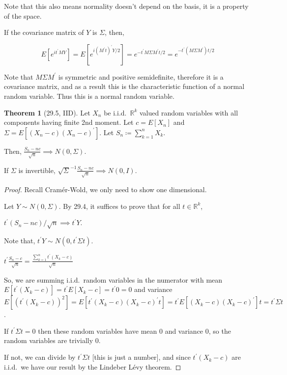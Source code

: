 \documentclass{article}
\theoremstyle{definition}
\newtheorem{theorem}{Theorem}
\begin{document}
Note that this also means normality doesn't depend on the basis, it is a property of the space.

If the covariance matrix of \(Y\) is \(\Sigma\), then,

\[
    E[e^{it^{\prime} MY}] = E[e^{i(M^{\prime} t)^{\prime} Y / 2}] = e^{- t^{\prime} M \Sigma M^{\prime}  t / 2} = e^{-t^{\prime} (M \Sigma M^{\prime} ) t / 2}
\]

Note that \(M \Sigma M^{\prime}\) is symmetric and positive semidefinite, therefore it is a covariance matrix, and as a result this is the characteristic function of a normal random variable. Thus this is a normal random variable.

\begin{theorem}
    [29.5, IID]

    Let \(X_n\) be i.i.d.\ \(\mathbb{R} ^k\) valued random variables with all components having finite 2nd moment. Let \(c = E[X_n]\) and \(\Sigma = E[(X_n - c)(X_n - c)^{\prime}]\). Let \(S_n \coloneqq \sum_{k=1}^{n} X_k\).
    
    Then, \(\frac{S_n - nc}{\sqrt{n}} \implies N(0,\Sigma)\).
    
    If \(\Sigma\) is invertible, \(\sqrt{\Sigma}^{-1} \frac{S_n - nc}{\sqrt{n} } \implies N(0,I) \).
    
\end{theorem}

\begin{proof}
    Recall Cram\'er-Wold, we only need to show one dimensional.

    Let \(Y\sim N(0,\Sigma)\). By 29.4, it suffices to prove that for all \(t\in\mathbb{R}^k\),
    
    \(t^{\prime} (S_n - nc) / \sqrt{n} \implies t^{\prime} Y \).
    
    Note that, \(t^{\prime} Y \sim N(0,t^{\prime} \Sigma t)\).

    \(t^{\prime} \frac{S_n -c}{\sqrt{n}} = \frac{\sum_{k=1}^{n} t^{\prime} (X_k - c)}{\sqrt{n}}\) 

    So, we are summing i.i.d.\  random variables in the numerator with mean \(E[t^{\prime} (X_k - c)] = t^{\prime} E[X_k - c] = t^{\prime} 0 = 0\) and variance \(E[(t^{\prime} (X_k -c))^2] = E[t^{\prime} (X_k - c)(X_k - c)^{\prime} t] = t^{\prime} E[(X_k - c)(X_k - c)^{\prime} ] t = t^{\prime} \Sigma t\).
    
    If \(t^{\prime} \Sigma t = 0\) then these random variables have mean \(0\) and variance \(0\), so the random variables are trivially \(0\).

    If not, we can divide by \(t^{\prime} \Sigma t\) [this is just a number], and since \(t^{\prime} (X_k - c)\) are i.i.d.\  we have our result by the Lindeber L\'evy theorem.

\end{proof}
\end{document}
